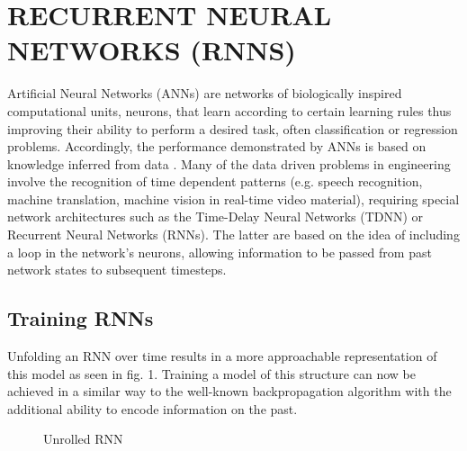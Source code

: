 \documentclass[letterpaper, 10 pt, conference]{ieeeconf}  %
\begin{document}
\section{RECURRENT NEURAL NETWORKS (RNNS)}
Artificial Neural Networks (ANNs) are networks of biologically inspired computational units, neurons, that learn 
according to certain learning rules thus improving their ability to perform a desired task, often classification or regression 
problems. Accordingly, the performance demonstrated by ANNs is based on knowledge inferred from data \cite{schusterBidirectionalRecurrentNeural1997}.
Many of the data driven problems in engineering involve the recognition of time dependent patterns (e.g. speech
recognition, machine translation, machine vision in real-time video material), requiring special
network architectures such as the Time-Delay Neural Networks (TDNN) \cite{waibelPhonemeRecognitionUsing1989} or Recurrent Neural Networks (RNNs). 
The latter are based on the idea of including a loop in the network's neurons, allowing information to be passed 
from past network states to subsequent timesteps. 

\subsection{Training RNNs}
Unfolding an RNN over time results in a more approachable representation of this model as seen in fig. 1. Training a 
model of this structure can now be achieved in a similar way to the well-known backpropagation algorithm with the additional 
ability to encode information on the past\cite{werbosBackpropagationTimeWhat1990}. 
\begin{figure}[thpb]
        \centering
  \caption{Unrolled RNN \cite{UnderstandingLSTMNetworks}}
        \label{figurelabel}
     \end{figure}
\end{document}
